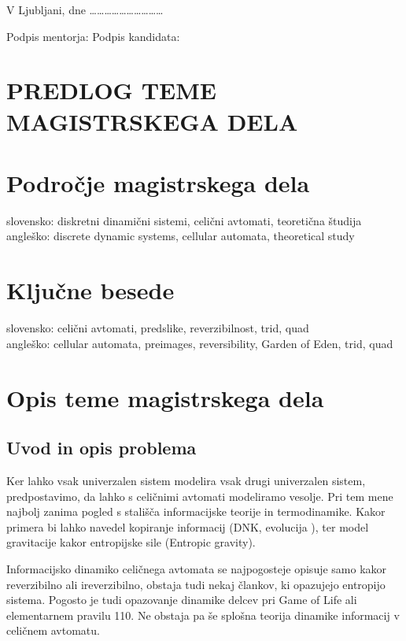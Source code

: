 \documentclass[a4paper, 12pt]{article}
\begin{document}
\bigskip

V Ljubljani, dne …………………………

Podpis mentorja: \hspace{180px} Podpis kandidata:




\clearpage
\section*{PREDLOG TEME MAGISTRSKEGA DELA}

\section{Področje magistrskega dela}

slovensko: diskretni dinamični sistemi, celični avtomati, teoretična študija \\
angleško: discrete dynamic systems, cellular automata, theoretical study


\section{Ključne besede}

slovensko: celični avtomati, predslike, reverzibilnost, trid, quad   \\
angleško: cellular automata, preimages, reversibility, Garden of Eden,  trid, quad


\section{Opis teme magistrskega dela}

\subsection{Uvod in opis problema}

Ker lahko vsak univerzalen sistem modelira vsak drugi univerzalen sistem, predpostavimo,
da lahko s celičnimi avtomati modeliramo vesolje. Pri tem mene najbolj zanima pogled s
stališča informacijske teorije in termodinamike. Kakor primera bi lahko navedel kopiranje informacij
(DNK, evolucija \cite{Salzberg2004}), ter model gravitacije kakor entropijske sile (Entropic gravity).

Informacijsko dinamiko celičnega avtomata se najpogosteje opisuje samo kakor reverzibilno ali ireverzibilno,
obstaja tudi nekaj člankov, ki opazujejo entropijo sistema.
Pogosto je tudi opazovanje dinamike delcev pri Game of Life ali elementarnem pravilu 110.
Ne obstaja pa še splošna teorija dinamike informacij v celičnem avtomatu.
\end{document}
